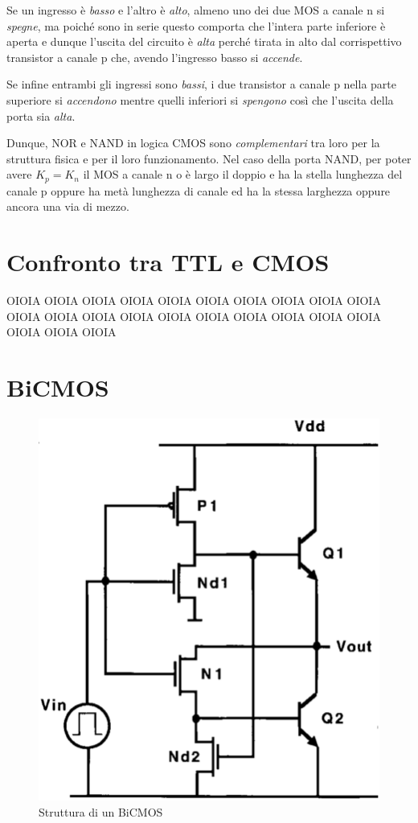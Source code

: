 \documentclass[12pt, a4paper]{report}
\begin{document}
Se un ingresso è \textit{basso} e l'altro è \textit{alto}, almeno uno dei due MOS a canale n si \textit{spegne}, ma poiché sono in serie questo comporta che l'intera parte inferiore è aperta e dunque l'uscita del circuito è \textit{alta} perché tirata in alto dal corrispettivo transistor a canale p che, avendo l'ingresso basso si \textit{accende}.

Se infine entrambi gli ingressi sono \textit{bassi}, i due transistor a canale p nella parte superiore si \textit{accendono} mentre quelli inferiori si \textit{spengono} così che l'uscita della porta sia \textit{alta}.

Dunque, NOR e NAND in logica CMOS sono \textit{complementari} tra loro per la struttura fisica e per il loro funzionamento. Nel caso della porta NAND, per poter avere $K_{p} = K_{n}$ il MOS a canale n o è largo il doppio e ha la stella lunghezza del canale p oppure ha metà lunghezza di canale ed ha la stessa larghezza oppure ancora una via di mezzo.

\section{Confronto tra TTL e CMOS}
OIOIA OIOIA OIOIA OIOIA OIOIA OIOIA OIOIA OIOIA OIOIA OIOIA OIOIA OIOIA OIOIA OIOIA OIOIA OIOIA OIOIA OIOIA OIOIA OIOIA OIOIA OIOIA OIOIA

\section{BiCMOS}

\begin{figure}[h]
    \centering
    \includegraphics[scale=0.38,angle=0]{bicmos.png}
    \caption{Struttura di un BiCMOS}
\end{figure}
\end{document}
